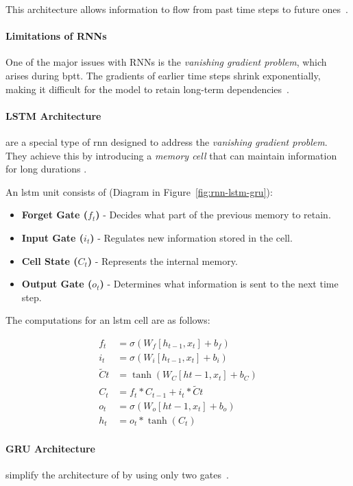 This architecture allows information to flow from past time steps to future ones~\parencite{nabipour2020DeepLearning}.

\paragraph{Limitations of RNNs}
One of the major issues with RNNs is the \emph{vanishing gradient problem}, which arises during \acrfull{bptt}. 
The gradients of earlier time steps shrink exponentially, making it difficult for the model to retain long-term 
dependencies~\parencite{parmar2018stock}.

\paragraph{LSTM Architecture}  are a special type of \acrshort{rnn} designed to address the 
\emph{vanishing gradient problem}. They achieve this by introducing a \emph{memory cell} that can maintain 
information for long durations \parencite{phuoc2024StockPrediction}.

An \acrshort{lstm} unit consists of (Diagram in Figure~\ref{fig:rnn-lstm-gru}):
\begin{itemize}
\item \textbf{Forget Gate ($f_t$)} - Decides what part of the previous memory to retain.
\item \textbf{Input Gate ($i_t$)} - Regulates new information stored in the cell.
\item \textbf{Cell State ($C_t$)} - Represents the internal memory.
\item \textbf{Output Gate ($o_t$)} - Determines what information is sent to the next time step.
\end{itemize}

The computations for an \acrshort{lstm} cell are as follows:

\begin{align}
f_t &= \sigma(W_f [h_{t-1}, x_t] + b_f) \\
i_t &= \sigma(W_i [h_{t-1}, x_t] + b_i) \\
\tilde{C}t &= \tanh(W_C [h{t-1}, x_t] + b_C) \\
C_t &= f_t * C_{t-1} + i_t * \tilde{C}t \\
o_t &= \sigma(W_o [h{t-1}, x_t] + b_o) \\
h_t &= o_t * \tanh(C_t)
\end{align}

\paragraph{GRU Architecture}  simplify the architecture of  by using only two 
gates~\parencite{chang2024StockPrediction}.


